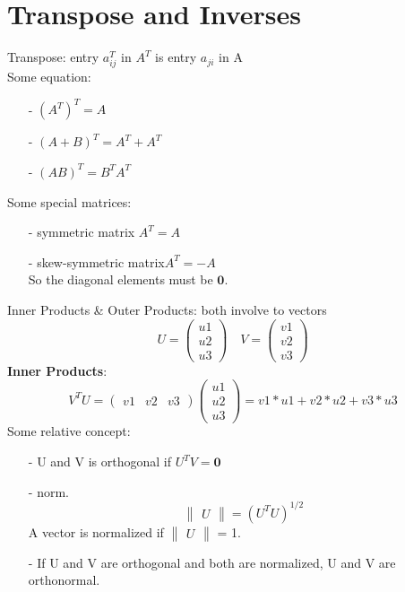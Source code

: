 \documentclass[a4paper,10pt]{article}
\begin{document}
\section{Transpose and Inverses}
Transpose: entry $a_{ij}^T$ in $A^T$ is entry $a_{ji}$ in A\\
Some equation:
\begin{itemize}
\item[-] $(A^T)^T = A$
\item[-] $(A + B)^T = A^T + A^T$
\item[-] $(AB)^T = B^TA^T$
\end{itemize}
Some special matrices:
\begin{itemize}
\item[-] symmetric matrix $A^T = A$
\item[-] skew-symmetric matrix$A^T = -A$\\
So the diagonal elements must be $\mathbf{0}$.
\end{itemize}
Inner Products \& Outer Products: both involve to vectors\\
\[U = \begin{pmatrix} u1 \\ u2 \\ u3 \end{pmatrix}
%
\quad V = \begin{pmatrix} v1 \\ v2 \\ v3 \end{pmatrix}\]
\textbf{Inner Products}:
\begin{equation}
V^TU = \begin{pmatrix} v1 & v2 & v3 \end{pmatrix} \begin{pmatrix} u1 \\ u2 \\ u3 \end{pmatrix} 
 = v1*u1 + v2*u2 + v3*u3
\end{equation}
Some relative concept:
\begin{itemize}
\item[-] U and V is orthogonal if $U^TV = \mathbf{0}$
\item[-] norm. \begin{equation}\begin{Vmatrix}U\end{Vmatrix} = (U^TU)^{1/2}\end{equation}
A vector is normalized if $\begin{Vmatrix}U\end{Vmatrix} $ = 1.
\item[-] If U and V are orthogonal and both are normalized, U and V are orthonormal.
\end{itemize}
\end{document}
